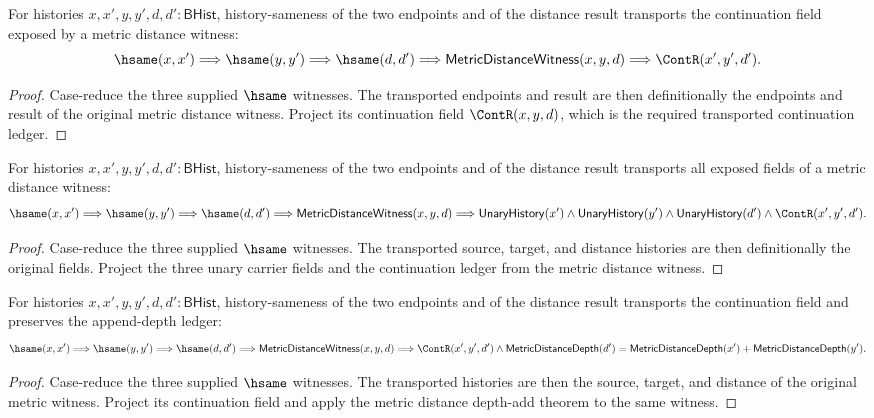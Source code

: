 \begin{theorem}
\label{thm:metric-distance-witness-cont-hsame-transport}
For histories $x,x',y,y',d,d':\mathsf{BHist}$, history-sameness of the two
endpoints and of the distance result transports the continuation field exposed
by a metric distance witness:
$$
\hsame(x,x')\Longrightarrow
\hsame(y,y')\Longrightarrow
\hsame(d,d')\Longrightarrow
\mathsf{MetricDistanceWitness}(x,y,d)\Longrightarrow
\ContR(x',y',d').
$$
\end{theorem}
\begin{proof}
Case-reduce the three supplied $\hsame$ witnesses. The transported endpoints
and result are then definitionally the endpoints and result of the original
metric distance witness. Project its continuation field
$\ContR(x,y,d)$, which is the required transported continuation ledger.
\end{proof}

\begin{theorem}
\label{thm:metric-distance-witness-hsame-fields-transport}
For histories $x,x',y,y',d,d':\mathsf{BHist}$, history-sameness of the two
endpoints and of the distance result transports all exposed fields of a metric
distance witness:
$$
\hsame(x,x')\Longrightarrow
\hsame(y,y')\Longrightarrow
\hsame(d,d')\Longrightarrow
\mathsf{MetricDistanceWitness}(x,y,d)\Longrightarrow
\mathsf{UnaryHistory}(x')\land
\mathsf{UnaryHistory}(y')\land
\mathsf{UnaryHistory}(d')\land
\ContR(x',y',d').
$$
\end{theorem}
\begin{proof}
Case-reduce the three supplied $\hsame$ witnesses. The transported source,
target, and distance histories are then definitionally the original fields.
Project the three unary carrier fields and the continuation ledger from the
metric distance witness.
\end{proof}

\begin{theorem}
\label{thm:metric-distance-witness-hsame-transport-cont-depth-add}
For histories $x,x',y,y',d,d':\mathsf{BHist}$, history-sameness of the two
endpoints and of the distance result transports the continuation field and
preserves the append-depth ledger:
$$
\hsame(x,x')\Longrightarrow
\hsame(y,y')\Longrightarrow
\hsame(d,d')\Longrightarrow
\mathsf{MetricDistanceWitness}(x,y,d)\Longrightarrow
\ContR(x',y',d')\land
\mathsf{MetricDistanceDepth}(d')=
\mathsf{MetricDistanceDepth}(x')+\mathsf{MetricDistanceDepth}(y').
$$
\end{theorem}
\begin{proof}
Case-reduce the three supplied $\hsame$ witnesses. The transported histories
are then the source, target, and distance of the original metric witness.
Project its continuation field and apply the metric distance depth-add theorem
to the same witness.
\end{proof}

